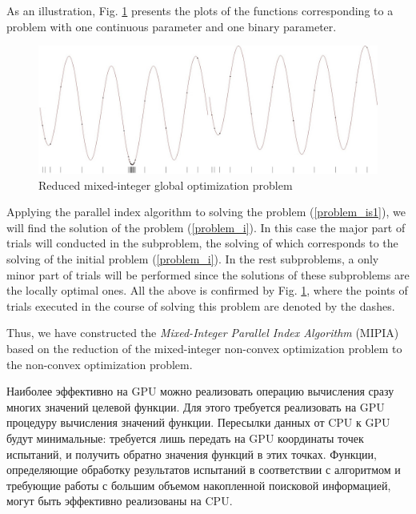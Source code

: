 \documentclass{llncs}
\begin{document}
As an illustration, Fig. \ref{fig:1} presents the plots of the functions corresponding to a 
problem with one continuous parameter and one binary parameter.

\begin{figure}[ht]
    \centering
    \includegraphics[width=1.0\textwidth] {fig1.jpg}
    \caption{Reduced mixed-integer global optimization problem}
    \label{fig:1}
\end{figure}

Applying the parallel index algorithm to solving the problem (\ref{problem_is1}), we will find 
the solution of the problem (\ref{problem_i}). In this case the major part of trials will conducted in 
the subproblem, the solving of which corresponds to the solving of the initial 
problem (\ref{problem_i}). In the rest subproblems, a only minor part of trials will be performed 
since the solutions of these subproblems are the locally optimal ones.
All the above is confirmed by Fig. \ref{fig:1}, where the  
points of trials executed in the course of solving this problem are denoted by the dashes.


Thus, we have constructed the \textit{Mixed-Integer Parallel Index Algorithm} (MIPIA) based on the  
reduction of the mixed-integer non-convex optimization problem to the non-convex optimization problem. 

Наиболее эффективно на GPU можно реализовать операцию вычисления сразу многих значений целевой функции. Для этого требуется реализовать на GPU процедуру вычисления значений функции. Пересылки данных от CPU к GPU будут минимальные: требуется лишь передать на GPU координаты точек испытаний, и получить обратно значения функций в этих точках. Функции, определяющие обработку результатов испытаний в соответствии с алгоритмом и требующие работы с большим объемом накопленной поисковой информацией, могут быть эффективно реализованы на CPU.
\end{document}
